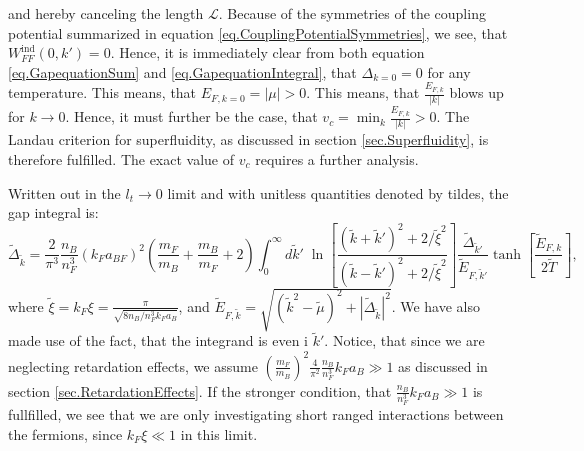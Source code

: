 and hereby canceling the length $\mathcal{L}$. Because of the symmetries of the coupling potential summarized in equation \eqref{eq.CouplingPotentialSymmetries}, we see, that $W^\text{ind}_{FF}(0,k') = 0$. Hence, it is immediately clear from both equation \eqref{eq.GapequationSum} and \eqref{eq.GapequationIntegral}, that $\Delta_{k=0} = 0$ for any temperature. This means, that $E_{F,k=0} = |\mu| > 0$. This means, that $\frac{E_{F,k}}{|k|}$ blows up for $k\to 0$. Hence, it must further be the case, that $v_c = \min_k \frac{E_{F,k}}{|k|} > 0$. The Landau criterion for superfluidity, as discussed in section \ref{sec.Superfluidity}, is therefore fulfilled. The exact value of $v_c$ requires a further analysis. 

Written out in the $l_t \to 0$ limit and with unitless quantities denoted by tildes, the gap integral is:
\begin{equation}
\tilde{\Delta}_{\tilde{k}} = \frac{2}{\pi^3}\frac{n_B}{n_F^3}(k_Fa_{BF})^2\left(\frac{m_F}{m_B} + \frac{m_B}{m_F}+ 2\right) \int_0^\infty d\tilde{k}' \; \ln\left[\frac{(\tilde{k}+\tilde{k}')^2+2/\tilde{\xi}^2}{(\tilde{k}-\tilde{k}')^2+2/\tilde{\xi}^2}\right] \frac{\tilde{\Delta}_{\tilde{k}'}}{\tilde{E}_{F,\tilde{k}'}}\tanh\left[\frac{\tilde{E}_{F,k}}{2\tilde{T}}\right],
\label{eq.GapequationIntegralUnitless}
\end{equation} 
where $\tilde{\xi} = k_F\xi = \frac{\pi}{\sqrt{8 n_B/n_F^3 k_Fa_B}}$, and $\tilde{E}_{F,\tilde{k}} = \sqrt{(\tilde{k}^2-\tilde{\mu})^2 + |\tilde{\Delta}_{\tilde{k}}|^2}$. We have also made use of the fact, that the integrand is even i $\tilde{k}'$. Notice, that since we are neglecting retardation effects, we assume $\left(\frac{m_F}{m_B}\right)^2\frac{4}{\pi^2}\frac{n_B}{n_F^3}k_Fa_B \gg 1$ as discussed in section \ref{sec.RetardationEffects}. If the stronger condition, that $\frac{n_B}{n_F^3}k_Fa_B \gg 1$ is fullfilled, we see that we are only investigating short ranged interactions between the fermions, since $k_F\xi \ll 1$ in this limit. 

